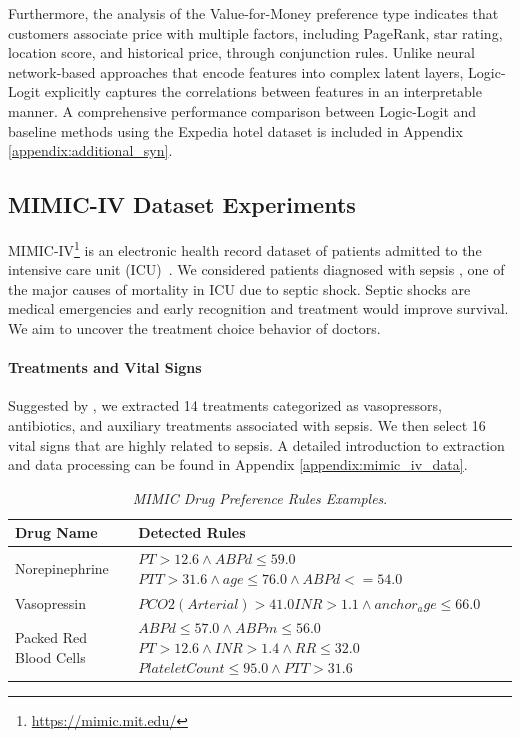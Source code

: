 \documentclass{article} %
\begin{document}
Furthermore, the analysis of the Value-for-Money preference type indicates that customers associate price with multiple factors, including PageRank, star rating, location score, and historical price, through conjunction rules. Unlike neural network-based approaches that encode features into complex latent layers, Logic-Logit explicitly captures the correlations between features in an interpretable manner. A comprehensive performance comparison between Logic-Logit and baseline methods using the Expedia hotel dataset is included in Appendix \ref{appendix:additional_syn}.

%

%
%
%
%
%
%







\subsection{MIMIC-IV Dataset Experiments}
MIMIC-IV\footnote{\url{https://mimic.mit.edu/}} is an electronic health record dataset of patients admitted to the intensive care unit (ICU)~\citep{johnson2023mimic}. We considered patients diagnosed with sepsis \citep{saria2018individualized}, one of the major causes of mortality in ICU due to septic shock. Septic shocks are medical emergencies and early recognition and treatment would improve survival. We aim to uncover the treatment choice behavior of doctors.

\paragraph{Treatments and Vital Signs} Suggested by \citep{komorowski2018artificial}, we extracted 14 treatments categorized as vasopressors, antibiotics, and auxiliary treatments associated with sepsis. We then select 16 vital signs that are highly related to sepsis. A detailed introduction to extraction and data processing can be found in Appendix \ref{appendix:mimic_iv_data}.
\begin{table}[h!]
\small  %
\setlength{\tabcolsep}{4pt}  %
    \centering
    \begin{tabular}{p{4cm}|p{8cm}}
    \toprule
        Drug Name & Detected Rules\\
        \hline
        \hline
Norepinephrine& $PT > 12.6 \wedge ABPd \leq 59.0$ \newline $PTT > 31.6 \wedge age \leq 76.0 \wedge ABPd <= 54.0$ \\
        \hline
        Vasopressin   & $PCO2 (Arterial) > 41.0$\newline  $INR > 1.1 \wedge anchor_age \leq 66.0$\\
        \hline
        Packed Red Blood Cells & $ABPd \leq 57.0 \wedge ABPm \leq 56.0$\newline $PT > 12.6 \wedge INR > 1.4 \wedge RR \leq 32.0$\newline$Platelet Count \leq 95.0 \wedge PTT > 31.6$ \\
    \bottomrule
    \end{tabular}
    \caption{\textit{MIMIC Drug Preference Rules Examples}.}
    \label{tab:mimic-drug-rules-main}
\end{table}
\end{document}
